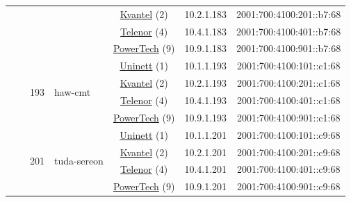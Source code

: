 \begin{small}
\begin{center}
\begin{longtable}{|c|c|c|c|c|c|c|c|}
  &  &  &  & \multicolumn{2}{|c|}{\tiny{\href{http://kvantel.no}{Kvantel} (2)}} & \tiny{10.2.1.183} & \tiny{2001:700:4100:201::b7:68} \\* \cline{5-5}\cline{6-6}\cline{7-7}\cline{8-8}
  &  &  &  & \multicolumn{2}{|c|}{\tiny{\href{https://www.telenor.no}{Telenor} (4)}} & \tiny{10.4.1.183} & \tiny{2001:700:4100:401::b7:68} \\* \cline{5-5}\cline{6-6}\cline{7-7}\cline{8-8}
  &  &  &  & \multicolumn{2}{|c|}{\tiny{\href{http://www.powertech.no}{PowerTech} (9)}} & \tiny{10.9.1.183} & \tiny{2001:700:4100:901::b7:68} \\* \cline{3-3}\cline{4-4}\cline{5-5}\cline{6-6}\cline{7-7}\cline{8-8}
  &  & \multirow{4}{*}{\tiny{193}} & \multicolumn{1}{|l|}{\multirow{4}{*}{\tiny{haw-cmt}}} & \multicolumn{2}{|c|}{\tiny{\href{https://www.uninett.no}{Uninett} (1)}} & \tiny{10.1.1.193} & \tiny{2001:700:4100:101::c1:68} \\* \cline{5-5}\cline{6-6}\cline{7-7}\cline{8-8}
  &  &  &  & \multicolumn{2}{|c|}{\tiny{\href{http://kvantel.no}{Kvantel} (2)}} & \tiny{10.2.1.193} & \tiny{2001:700:4100:201::c1:68} \\* \cline{5-5}\cline{6-6}\cline{7-7}\cline{8-8}
  &  &  &  & \multicolumn{2}{|c|}{\tiny{\href{https://www.telenor.no}{Telenor} (4)}} & \tiny{10.4.1.193} & \tiny{2001:700:4100:401::c1:68} \\* \cline{5-5}\cline{6-6}\cline{7-7}\cline{8-8}
  &  &  &  & \multicolumn{2}{|c|}{\tiny{\href{http://www.powertech.no}{PowerTech} (9)}} & \tiny{10.9.1.193} & \tiny{2001:700:4100:901::c1:68} \\* \cline{3-3}\cline{4-4}\cline{5-5}\cline{6-6}\cline{7-7}\cline{8-8}
  &  & \multirow{4}{*}{\tiny{201}} & \multicolumn{1}{|l|}{\multirow{4}{*}{\tiny{tuda-sereon}}} & \multicolumn{2}{|c|}{\tiny{\href{https://www.uninett.no}{Uninett} (1)}} & \tiny{10.1.1.201} & \tiny{2001:700:4100:101::c9:68} \\* \cline{5-5}\cline{6-6}\cline{7-7}\cline{8-8}
  &  &  &  & \multicolumn{2}{|c|}{\tiny{\href{http://kvantel.no}{Kvantel} (2)}} & \tiny{10.2.1.201} & \tiny{2001:700:4100:201::c9:68} \\* \cline{5-5}\cline{6-6}\cline{7-7}\cline{8-8}
  &  &  &  & \multicolumn{2}{|c|}{\tiny{\href{https://www.telenor.no}{Telenor} (4)}} & \tiny{10.4.1.201} & \tiny{2001:700:4100:401::c9:68} \\* \cline{5-5}\cline{6-6}\cline{7-7}\cline{8-8}
  &  &  &  & \multicolumn{2}{|c|}{\tiny{\href{http://www.powertech.no}{PowerTech} (9)}} & \tiny{10.9.1.201} & \tiny{2001:700:4100:901::c9:68} \\* \cline{3-3}\cline{4-4}\cline{5-5}\cline{6-6}\cline{7-7}\cline{8-8}

\end{longtable}
\end{center}
\end{small}
